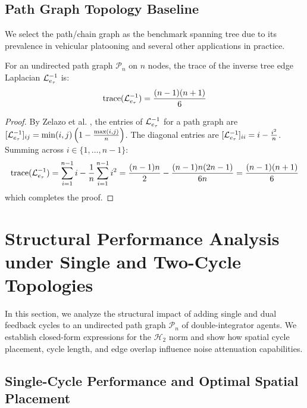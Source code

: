 \subsection{Path Graph Topology Baseline}

We select the path/chain graph as the benchmark spanning tree due to its prevalence in vehicular platooning and several other applications in practice.

\begin{lemma}\label{traceInverse}
For an undirected path graph $\mathcal{P}_n$ on $n$ nodes, the trace of the inverse tree edge Laplacian $\mathcal{L}_{e_{\tau}}^{-1}$ is:
\begin{equation}\label{traceinverseeq}
	\text{trace}(\mathcal{L}_{e_{\tau}}^{-1}) = \frac{(n-1)(n+1)}{6}
\end{equation}
\end{lemma}

\begin{proof}
By Zelazo et al. \cite{zelazo2010edge}, the entries of $\mathcal{L}_{e_{\tau}}^{-1}$ for a path graph are $[\mathcal{L}_{e_{\tau}}^{-1}]_{ij} = \min(i,j) \left( 1 - \frac{\max(i,j)}{n} \right)$. The diagonal entries are $[\mathcal{L}_{e_{\tau}}^{-1}]_{ii} = i - \frac{i^2}{n}$. Summing across $i \in \{1, \dots, n-1\}$:
\begin{equation}
	\text{trace}(\mathcal{L}_{e_{\tau}}^{-1}) = \sum_{i=1}^{n-1} i - \frac{1}{n} \sum_{i=1}^{n-1} i^2 = \frac{(n-1)n}{2} - \frac{(n-1)n(2n-1)}{6n} = \frac{(n-1)(n+1)}{6}
\end{equation}
which completes the proof.
\end{proof}




\section{Structural Performance Analysis under Single and Two-Cycle Topologies}\label{sec:ch_RA_CycleAnalysis}

In this section, we analyze the structural impact of adding single and dual feedback cycles to an undirected path graph $\mathcal{P}_n$ of double-integrator agents. We establish closed-form expressions for the $\mathcal{H}_2$ norm and show how spatial cycle placement, cycle length, and edge overlap influence noise attenuation capabilities.

\subsection{Single-Cycle Performance and Optimal Spatial Placement}

